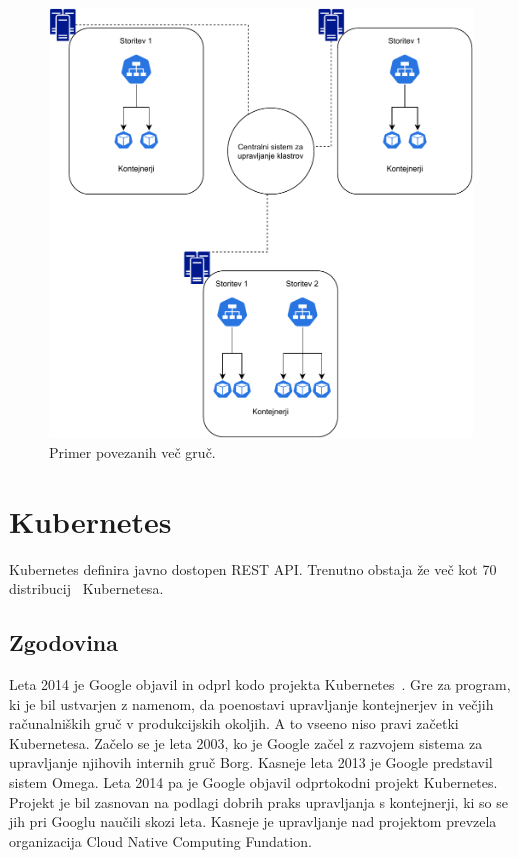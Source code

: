 \documentclass[a4paper, 12pt]{book}
\begin{document}
\begin{figure}[h]
\begin{center}
\includegraphics[width=1.0\textwidth]{images/primer-povezanih-gruc.pdf}
\end{center}
\caption{Primer povezanih več gruč.}
\label{problem-povezanih-gruc}
\end{figure}

\chapter{Kubernetes}
\label{Kubernetes}
Kubernetes definira javno dostopen REST API.
Trenutno obstaja že več kot 70 distribucij~\cite{cncf} Kubernetesa.
\section{Zgodovina~\cite{mastering-kubernetes}}
Leta 2014 je Google objavil in odprl kodo projekta Kubernetes~\cite{what-is-Kubernetes}.
Gre za program, ki je bil ustvarjen z namenom, da poenostavi upravljanje kontejnerjev in večjih računalniških gruč v produkcijskih okoljih.
A to vseeno niso pravi začetki Kubernetesa.
Začelo se je leta 2003, ko je Google začel z razvojem sistema za upravljanje njihovih internih gruč Borg.
Kasneje leta 2013 je Google predstavil sistem Omega.
Leta 2014 pa je Google objavil odprtokodni projekt Kubernetes. 
Projekt je bil zasnovan na podlagi dobrih praks upravljanja s kontejnerji, ki so se jih pri Googlu naučili skozi leta.
Kasneje je upravljanje nad projektom prevzela organizacija Cloud Native Computing Fundation.
\end{document}
